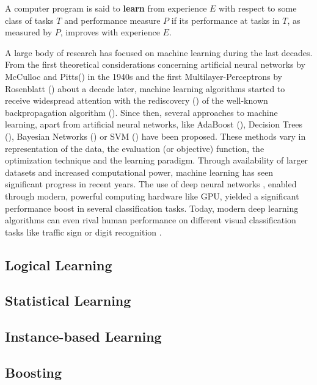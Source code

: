 \begin{defn}
A computer program is said to \textbf{learn} from experience $E$ with respect to some class of tasks $T$ and performance measure $P$ if its performance at tasks in $T$, as measured by $P$, improves with experience $E$.
\end{defn}
A large body of research has focused on machine learning during the last decades.
From the first theoretical considerations concerning artificial neural networks by McCulloc and Pitts() in the 1940s and the first Multilayer-Perceptrons by Rosenblatt () about a decade later, machine learning algorithms started to receive widespread attention with the rediscovery () of the well-known backpropagation algorithm ().
Since then, several approaches to machine learning, apart from artificial neural networks, like AdaBoost (), Decision Trees (), Bayesian Networks () or \ac{SVM} () have been proposed.
These methods vary in representation of the data, the evaluation (or objective) function, the optimization technique and the learning paradigm.
Through availability of larger datasets and increased computational power, machine learning has seen significant progress in recent years.
The use of deep neural networks \cite{Schmidhuber2015}, enabled through modern, powerful computing hardware like \ac{GPU}, yielded a significant performance boost in several classification tasks. 
Today, modern deep learning algorithms can even rival human performance on different visual classification tasks like traffic sign \cite{Ciresan2012} or digit recognition \cite{Ciresan2012a}.
\subsection{Logical Learning}
\subsection{Statistical Learning}
\subsection{Instance-based Learning}
\subsection{Boosting}

